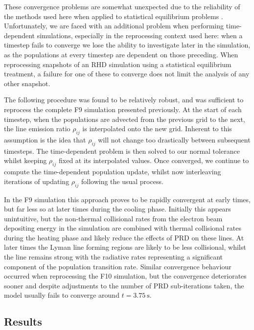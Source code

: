 These convergence problems are somewhat unexpected due to the reliability of the methods used here when applied to statistical equilibrium problems \citep[e.g.][]{Uitenbroek2001}.
Unfortunately, we are faced with an additional problem when performing time-dependent simulations, especially in the reprocessing context used here: when a timestep fails to converge we lose the ability to investigate later in the simulation, as the populations at every timestep are dependent on those preceding.
When reprocessing snapshots of an RHD simulation using a statistical equilibrium treatment, a failure for one of these to converge does not limit the analysis of any other snapshot.

The following procedure was found to be relatively robust, and was sufficient to reprocess the complete F9 simulation presented previously.
At the start of each timestep, when the populations are advected from the previous grid to the next, the line emission ratio $\rho_{ij}$ is interpolated onto the new grid.
Inherent to this assumption is the idea that $\rho_{ij}$ will not change too drastically between subsequent timesteps.
The time-dependent problem is then solved to our normal tolerance whilst keeping $\rho_{ij}$ fixed at its interpolated values.
Once converged, we continue to compute the time-dependent population update, whilst now interleaving iterations of updating $\rho_{ij}$ following the usual process.

In the F9 simulation this approach proves to be rapidly convergent at early times, but far less so at later times during the cooling phase.
Initially this appears unintuitive, but the non-thermal collisional rates from the electron beam depositing energy in the simulation are combined with thermal collisional rates during the heating phase and likely reduce the effects of PRD on these lines.
At later times the Lyman line forming regions are likely to be less collisional, whilst the line remains strong with the radiative rates representing a significant component of the population transition rate.
Similar convergence behaviour occurred when reprocessing the F10 simulation, but the convergence deteriorates sooner and despite adjustments to the number of PRD sub-iterations taken, the model usually fails to converge around $t=\SI{3.75}{\second}$.

\subsection{Results}

